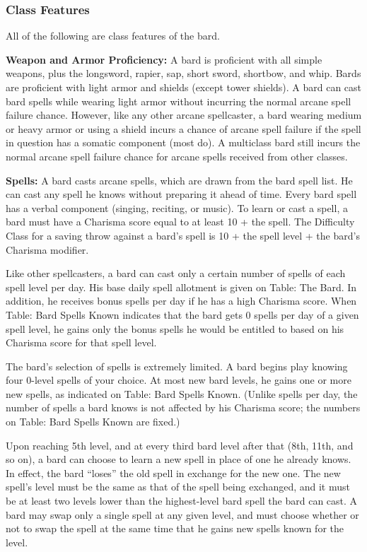 \documentclass{article}
\begin{document}
\vspace{12pt}
\subsubsection*{\textbf{Class Features}}

All of the following are class features of the bard.

\textbf{Weapon and Armor Proficiency:} A bard is proficient with all simple weapons, 
plus the longsword, rapier, sap, short sword, shortbow, and whip. Bards are proficient 
with light armor and shields (except tower shields). A bard can cast bard spells 
while wearing light armor without incurring the normal arcane spell failure chance. 
However, like any other arcane spellcaster, a bard wearing medium or heavy armor 
or using a shield incurs a chance of arcane spell failure if the spell in question 
has a somatic component (most do). A multiclass bard still incurs the normal arcane 
spell failure chance for arcane spells received from other classes.

\textbf{Spells:} A bard casts arcane spells, which are drawn from the bard spell 
list. He can cast any spell he knows without preparing it ahead of time. Every 
bard spell has a verbal component (singing, reciting, or music). To learn or cast 
a spell, a bard must have a Charisma score equal to at least 10 + the spell. The 
Difficulty Class for a saving throw against a bard's spell is 10 + the spell level 
+ the bard's Charisma modifier.

Like other spellcasters, a bard can cast only a certain number of spells of each 
spell level per day. His base daily spell allotment is given on Table: The Bard. 
In addition, he receives bonus spells per day if he has a high Charisma score. 
When Table: Bard Spells Known indicates that the bard gets 0 spells per day of 
a given spell level, he gains only the bonus spells he would be entitled to based 
on his Charisma score for that spell level.

The bard's selection of spells is extremely limited. A bard begins play knowing 
four 0-level spells of your choice. At most new bard levels, he gains one or more 
new spells, as indicated on Table: Bard Spells Known. (Unlike spells per day, the 
number of spells a bard knows is not affected by his Charisma score; the numbers 
on Table: Bard Spells Known are fixed.)

Upon reaching 5th level, and at every third bard level after that (8th, 11th, and 
so on), a bard can choose to learn a new spell in place of one he already knows. 
In effect, the bard ``loses'' the old spell in exchange for the new one. The new 
spell's level must be the same as that of the spell being exchanged, and it must 
be at least two levels lower than the highest-level bard spell the bard can cast. 
A bard may swap only a single spell at any given level, and must choose whether 
or not to swap the spell at the same time that he gains new spells known for the 
level.
\end{document}
